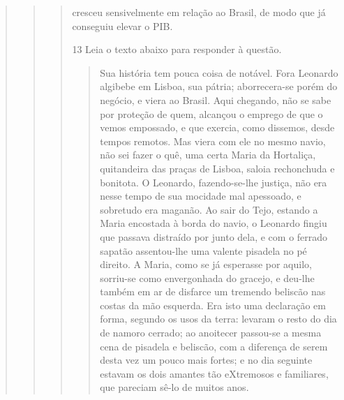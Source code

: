 \begin{quote}
\begin{quote}
\begin{quote}
\begin{escolha}
    \item cresceu sensivelmente em relação ao Brasil, de modo que já conseguiu elevar o PIB.

\end{escolha}


\num{13} Leia o texto abaixo para responder à questão. 

\begin{quote}

Sua história tem pouca coisa de notável. Fora Leonardo
algibebe em Lisboa, sua pátria; aborrecera-se porém do negócio,
e viera ao Brasil. Aqui chegando, não se sabe por proteção de
quem, alcançou o emprego de que o vemos empossado, e que
exercia, como dissemos, desde tempos remotos. Mas viera com
ele no mesmo navio, não sei fazer o quê, uma certa Maria da
Hortaliça, quitandeira das praças de Lisboa, saloia rechonchuda e
bonitota. O Leonardo, fazendo-se-lhe justiça, não era nesse tempo
de sua mocidade mal apessoado, e sobretudo era maganão. Ao
sair do Tejo, estando a Maria encostada à borda do navio, o
Leonardo fingiu que passava distraído por junto dela, e com o
ferrado sapatão assentou-lhe uma valente pisadela no pé direito.
A Maria, como se já esperasse por aquilo, sorriu-se como
envergonhada do gracejo, e deu-lhe também em ar de disfarce um
tremendo beliscão nas costas da mão esquerda. Era isto uma
declaração em forma, segundo os usos da terra: levaram o resto
do dia de namoro cerrado; ao anoitecer passou-se a mesma cena
de pisadela e beliscão, com a diferença de serem desta vez um
pouco mais fortes; e no dia seguinte estavam os dois amantes tão
eXtremosos e familiares, que pareciam sê-lo de muitos anos.

\end{quote}



\end{quote}
\end{quote}
\end{quote}
